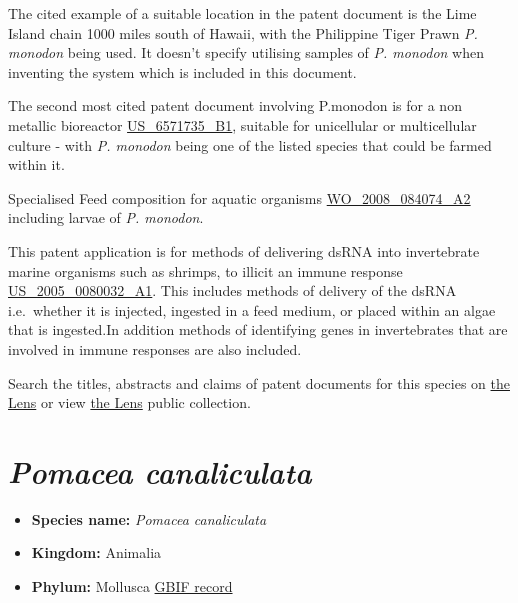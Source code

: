 \documentclass[openany]{book}
\providecommand{\tightlist}{%
  \setlength{\itemsep}{0pt}\setlength{\parskip}{0pt}}
\theoremstyle{definition}
\theoremstyle{definition}
\theoremstyle{definition}
\theoremstyle{remark}
\begin{document}
The cited example of a suitable location in the patent document is the
Lime Island chain 1000 miles south of Hawaii, with the Philippine Tiger
Prawn \emph{P. monodon} being used. It doesn't specify utilising samples
of \emph{P. monodon} when inventing the system which is included in this
document.

The second most cited patent document involving P.monodon is for a non
metallic bioreactor
\href{https://www.lens.org/lens/patent/US_6571735_B1}{US\_6571735\_B1},
suitable for unicellular or multicellular culture - with \emph{P.
monodon} being one of the listed species that could be farmed within it.

Specialised Feed composition for aquatic organisms
\href{https://www.lens.org/lens/patent/WO_2008_084074_A2}{WO\_2008\_084074\_A2}
including larvae of \emph{P. monodon}.

This patent application is for methods of delivering dsRNA into
invertebrate marine organisms such as shrimps, to illicit an immune
response
\href{https://www.lens.org/lens/patent/US_2005_0080032_A1}{US\_2005\_0080032\_A1}.
This includes methods of delivery of the dsRNA i.e.~whether it is
injected, ingested in a feed medium, or placed within an algae that is
ingested.In addition methods of identifying genes in invertebrates that
are involved in immune responses are also included.

Search the titles, abstracts and claims of patent documents for this
species on
\href{https://www.lens.org/lens/search?q=title:(\%22Penaeus\%20monodon\%22)\%20OR\%20abstract:(\%22Penaeus\%20monodon\%22)\%20OR\%20claims:(\%22Penaeus\%20monodon\%22)\&l=en\&preview=true}{the
Lens} or view \href{https://www.lens.org/lens/collection/24679}{the
Lens} public collection.

\hypertarget{pomacea-canaliculata}{%
\section{\texorpdfstring{\emph{Pomacea
canaliculata}}{Pomacea canaliculata}}\label{pomacea-canaliculata}}

\begin{itemize}
\tightlist
\item
  \textbf{Species name:} \emph{Pomacea canaliculata}
\item
  \textbf{Kingdom:} Animalia
\item
  \textbf{Phylum:} Mollusca
  \href{https://www.gbif.org/species/2292582}{GBIF record}
\end{itemize}
\end{document}
